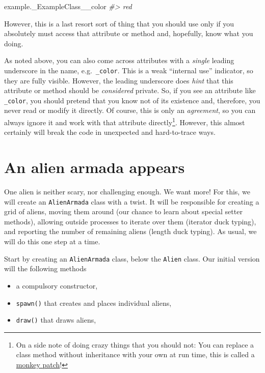\documentclass[
]{book}
\newenvironment{Shaded}{\begin{snugshade}}{\end{snugshade}}
\newcommand{\CommentTok}[1]{\textcolor[rgb]{0.56,0.35,0.01}{\textit{#1}}}
\newcommand{\NormalTok}[1]{#1}
\providecommand{\tightlist}{%
  \setlength{\itemsep}{0pt}\setlength{\parskip}{0pt}}
\begin{document}
\begin{Shaded}
\begin{Highlighting}[]
\NormalTok{example.\_ExampleClass\_\_color}
\CommentTok{\#\textgreater{} \textquotesingle{}red\textquotesingle{}}
\end{Highlighting}
\end{Shaded}

However, this is a last resort sort of thing that you should use only if you absolutely must access that attribute or method and, hopefully, know what you doing.

As noted above, you can also come across attributes with a \emph{single} leading underscore in the name, e.g.~\texttt{\_color}. This is a weak ``internal use'' indicator, so they are fully visible. However, the leading underscore does \emph{hint} that this attribute or method should be \emph{considered} private. So, if you see an attribute like \texttt{\_color}, you should pretend that you know not of its existence and, therefore, you never read or modify it directly. Of course, this is only an \emph{agreement}, so you can always ignore it and work with that attribute directly\footnote{On a side note of doing crazy things that you should not: You can replace a class method without inheritance with your own at run time, this is called a \href{https://en.wikipedia.org/wiki/Monkey_patch}{monkey patch}!}. However, this almost certainly will break the code in unexpected and hard-to-trace ways.

\hypertarget{an-alien-armada-appears}{%
\section{An alien armada appears}\label{an-alien-armada-appears}}

One alien is neither scary, nor challenging enough. We want more! For this, we will create an \texttt{AlienArmada} class with a twist. It will be responsible for creating a grid of aliens, moving them around (our chance to learn about special setter methods), allowing outside processes to iterate over them (iterator duck typing), and reporting the number of remaining aliens (length duck typing). As usual, we will do this one step at a time.

Start by creating an \texttt{AlienArmada} class, below the \texttt{Alien} class. Our initial version will the following methods

\begin{itemize}
\tightlist
\item
  a compulsory constructor,
\item
  \texttt{spawn()} that creates and places individual aliens,
\item
  \texttt{draw()} that draws aliens,
\end{itemize}
\end{document}
